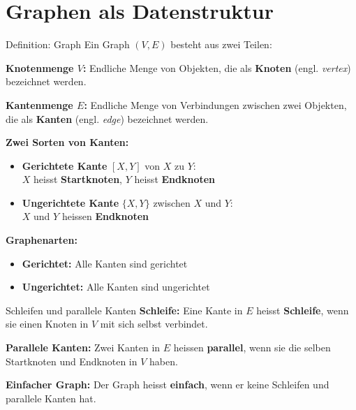 \documentclass[a4paper, fontsize=7pt]{scrartcl}
\begin{document}
\section{Graphen als Datenstruktur}

\begin{mainbox}{Definition: Graph}
Ein Graph $(V, E)$ besteht aus zwei Teilen:

\textbf{Knotenmenge $V$:}
Endliche Menge von Objekten, die als \textbf{Knoten} (engl. \textit{vertex}) bezeichnet werden.

\textbf{Kantenmenge $E$:}
Endliche Menge von Verbindungen zwischen zwei Objekten, die als \textbf{Kanten} (engl. \textit{edge}) bezeichnet werden.

\textbf{Zwei Sorten von Kanten:}
\begin{itemize}
    \item \textbf{Gerichtete Kante} $[X, Y]$ von $X$ zu $Y$:\\
          $X$ heisst \textbf{Startknoten}, $Y$ heisst \textbf{Endknoten}
    \item \textbf{Ungerichtete Kante} $\{X, Y\}$ zwischen $X$ und $Y$:\\
          $X$ und $Y$ heissen \textbf{Endknoten}
\end{itemize}

\textbf{Graphenarten:}
\begin{itemize}
    \item \textbf{Gerichtet:} Alle Kanten sind gerichtet
    \item \textbf{Ungerichtet:} Alle Kanten sind ungerichtet
\end{itemize}
\end{mainbox}

\begin{mainbox}{Schleifen und parallele Kanten}
\textbf{Schleife:}
Eine Kante in $E$ heisst \textbf{Schleife}, wenn sie einen Knoten in $V$ mit sich selbst verbindet.

\textbf{Parallele Kanten:}
Zwei Kanten in $E$ heissen \textbf{parallel}, wenn sie die selben Startknoten und Endknoten in $V$ haben.

\textbf{Einfacher Graph:}
Der Graph heisst \textbf{einfach}, wenn er keine Schleifen und parallele Kanten hat.
\end{mainbox}
\end{document}
